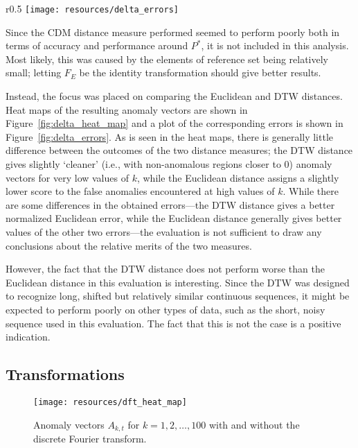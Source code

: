 \begin{wrapfigure}{r}{0.5\textwidth}
\changecaptionwidth
{}
\texttt{[image: resources/delta\_errors]}
\caption{\small{Errors for $A_{k, \delta}$.}}
\label{fig:delta_errors}
\end{wrapfigure}

Since the CDM distance measure performed seemed to perform poorly both in terms of accuracy and performance around $P^*$, it is not included in this analysis. Most likely, this was caused by the elements of reference set being relatively small; letting $F_E$ be the identity transformation should give better results.

Instead, the focus was placed on comparing the Euclidean and DTW distances. Heat maps of the resulting anomaly vectors are shown in Figure~\ref{fig:delta_heat_map} and a plot of the corresponding errors is shown in Figure~\ref{fig:delta_errors}. As is seen in the heat maps, there is generally little difference between the outcomes of the two distance measures; the DTW distance gives slightly `cleaner' (i.e.\@, with non-anomalous regions closer to $0$) anomaly vectors for very low values of $k$, while the Euclidean distance assigns a slightly lower score to the false anomalies encountered at high values of $k$. While there are some differences in the obtained errors---the DTW distance gives a better normalized Euclidean error, while the Euclidean distance generally gives better values of the other two errors---the evaluation is not sufficient to draw any conclusions about the relative merits of the two measures.

However, the fact that the DTW distance does not perform worse than the Euclidean distance in this evaluation is interesting. Since the DTW was designed to recognize long, shifted but relatively similar continuous sequences, it might be expected to perform poorly on other types of data, such as the short, noisy sequence used in this evaluation. The fact that this is not the case is a positive indication.

\clearpage

\subsection{Transformations}

\begin{figure}[h]
    \begin{center}
        \texttt{[image: resources/dft\_heat\_map]}
    \end{center}
    \caption{\small{Anomaly vectors $A_{k, t} $ for $k = 1,2,\dots,100$ with and without the discrete Fourier transform.}}
\label{fig:dft_heat_map}
\end{figure}

